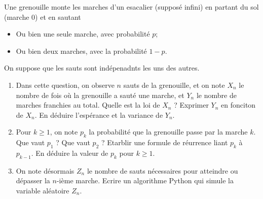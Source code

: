 




\begin{exercice}
Une grenouille monte les marches d'un esacalier (supposé infini) en partant du sol (marche 0) et  en sautant 
\begin{itemize}
\item Ou bien une seule marche, avec probabilité $p$; 
\item Ou bien deux marches, avec la probabilité $1-p$.
\end{itemize}
On suppose que les sauts sont indépenadnts les uns des autres. 
\begin{enumerate}
\item Dans cette question, on observe $n$ sauts de la grenouille, et on note $X_n$ le nombre de fois où la grenouille a sauté une marche, et $Y_n$ le nombre de marches franchies au total. Quelle est la loi de $X_n$ ? Exprimer $Y_n$ en fonciton de $X_n$. En déduire l'espérance et la variance de $Y_n$. 
\item Pour $k\geq 1$, on note $p_k$ la probabilité que la grenouille passe par la marche $k$. Que vaut $p_1 $ ? Que vaut $p_2$ ? Etarblir une formule de réurrence liant $p_k$ à $p_{k-1}$. En déduire la valeur de $p_k$ pour $k\geq 1$. 
\item On note désormais $Z_n$ le nombre de sauts nécessaires pour atteindre ou dépasser la $n$-ième marche. Ecrire un algorithme Python qui simule la variable aléatoire $Z_n$. 
\end{enumerate}
\end{exercice}
